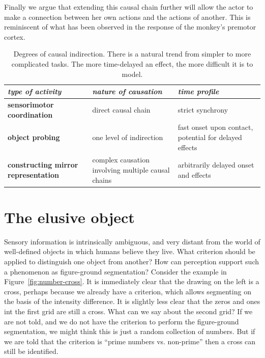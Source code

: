 Finally we argue that extending this causal chain further will allow
the actor to make a connection between her own actions and the actions 
of another. This is reminiscent of what has been observed in the response
of the monkey's premotor cortex. 


\begin{table}[htbp]
\begin{center}
\begin{tabular}{|p{5.2cm}|p{4.5cm}|p{4.5cm}|}
\hline
{\it type of activity} & {\it nature of causation} &  {\it time profile} \\ \hline\hline
{\bf sensorimotor coordination} & direct causal chain & strict synchrony \\ \hline
{\bf object probing} & one level of indirection & fast onset upon contact, potential for delayed effects\\ \hline
{\bf constructing mirror representation} &  complex causation involving multiple causal chains & arbitrarily delayed onset and effects\\ \hline
\end{tabular}
\caption{
\label{tab:causation}
%
Degrees of causal indirection. There is a natural
trend from simpler to more complicated tasks.  The more time-delayed
an effect, the more difficult it is to model.
%
}
\end{center}
\end{table}





\section{The elusive object}

\label{sect:introduction}

Sensory information is intrinsically ambiguous, and very distant from
the world of well-defined objects in which humans believe they live.  
What criterion should be applied to distinguish one object from
another?  How can perception support such a phenomenon as figure-ground
segmentation?  
Consider the example in Figure~\ref{fig:number-cross}.  It is
immediately clear that the drawing on the left is a cross, perhaps
because we already have a criterion, which allows segmenting on the
basis of the intensity difference. It is slightly less clear that the
zeros and ones int the first grid are still a cross. What can we say
about the second grid? If we are not told, and we do not have
the criterion to perform the figure-ground segmentation, we might
think this is just a random collection of numbers. But if we are told
that the criterion is ``prime numbers vs. non-prime'' then a cross can
still be identified.

